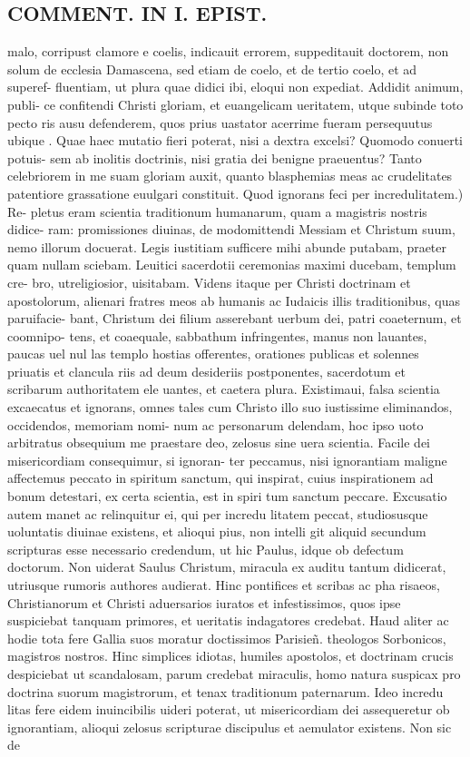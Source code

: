 \documentclass{article}
\begin{document}
\begin{pages}
\section*{COMMENT. IN I. EPIST. }
\marginpar{[ p.474 ]}\pstart malo, corripust clamore e coelis, indicauit errorem, suppeditauit doctorem, non solum de ecclesia Damascena, sed etiam de coelo, et de tertio coelo, et ad superef- fluentiam, ut plura quae didici ibi, eloqui non expediat. Addidit animum, publi- ce confitendi Christi gloriam, et euangelicam ueritatem, utque subinde toto pecto ris ausu defenderem, quos prius uastator acerrime fueram persequutus ubique . Quae haec mutatio fieri poterat, nisi a dextra excelsi? Quomodo conuerti potuis- sem ab inolitis doctrinis, nisi gratia dei benigne praeuentus? Tanto celebriorem in me suam gloriam auxit, quanto blasphemias meas ac crudelitates patentiore grassatione euulgari constituit. Quod ignorans feci per incredulitatem.) Re- pletus eram scientia traditionum humanarum, quam a magistris nostris didice- ram: promissiones diuinas, de modomittendi Messiam et Christum suum, nemo illorum docuerat. Legis iustitiam sufficere mihi abunde putabam, praeter quam nullam sciebam. Leuitici sacerdotii ceremonias maximi ducebam, templum cre- bro, utreligiosior, uisitabam. Videns itaque per Christi doctrinam et apostolorum, alienari fratres meos ab humanis ac Iudaicis illis traditionibus, quas paruifacie- bant, Christum dei filium asserebant uerbum dei, patri coaeternum, et coomnipo- tens, et coaequale, sabbathum infringentes, manus non lauantes, paucas uel nul las templo hostias offerentes, orationes publicas et solennes priuatis et clancula riis ad deum desideriis postponentes, sacerdotum et scribarum authoritatem ele uantes, et caetera plura. Existimaui, falsa scientia excaecatus et ignorans, omnes tales cum Christo illo suo iustissime eliminandos, occidendos, memoriam nomi- num ac personarum delendam, hoc ipso uoto arbitratus obsequium me praestare deo, zelosus sine uera scientia. Facile dei misericordiam consequimur, si ignoran- ter peccamus, nisi ignorantiam maligne affectemus peccato in spiritum sanctum, qui inspirat, cuius inspirationem ad bonum detestari, ex certa scientia, est in spiri tum sanctum peccare. Excusatio autem manet ac relinquitur ei, qui per incredu litatem peccat, studiosusque uoluntatis diuinae existens, et alioqui pius, non intelli git aliquid secundum scripturas esse necessario credendum, ut hic Paulus, idque ob defectum doctorum. Non uiderat Saulus Christum, miracula ex auditu tantum didicerat, utriusque rumoris authores audierat. Hinc pontifices et scribas ac pha risaeos, Christianorum et Christi aduersarios iuratos et infestissimos, quos ipse suspiciebat tanquam primores, et ueritatis indagatores credebat. Haud aliter ac hodie tota fere Gallia suos moratur doctissimos Parisieñ. theologos Sorbonicos, magistros nostros. Hinc simplices idiotas, humiles apostolos, et doctrinam crucis despiciebat ut scandalosam, parum credebat miraculis, homo natura suspicax pro doctrina suorum magistrorum, et tenax traditionum paternarum. Ideo incredu litas fere eidem inuincibilis uideri poterat, ut misericordiam dei assequeretur ob ignorantiam, alioqui zelosus scripturae discipulus et aemulator existens. Non sic de 
\end{pages}
\end{document}
